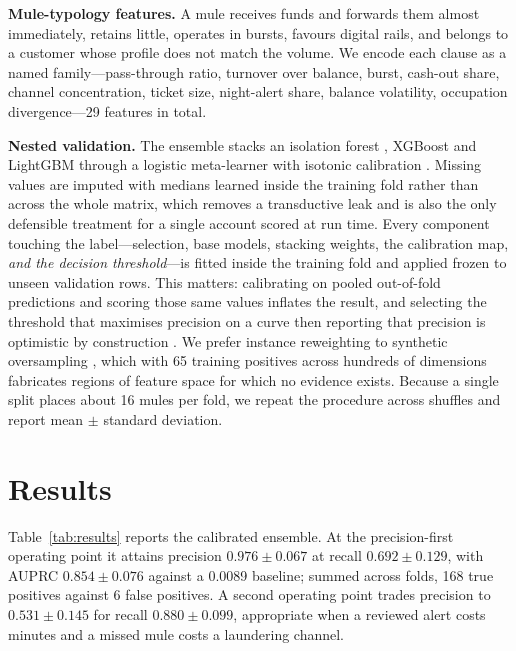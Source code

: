 \documentclass{article}
\begin{document}
\textbf{Mule-typology features.} A mule receives funds and forwards them almost
immediately, retains little, operates in bursts, favours digital rails, and
belongs to a customer whose profile does not match the volume. We encode each
clause as a named family---pass-through ratio, turnover over balance, burst,
cash-out share, channel concentration, ticket size, night-alert share, balance
volatility, occupation divergence---29 features in total.

\textbf{Nested validation.} The ensemble stacks an isolation forest
\cite{liu2008isolation}, XGBoost \cite{chen2016xgboost} and LightGBM
\cite{ke2017lightgbm} through a logistic meta-learner \cite{wolpert1992stacking}
with isotonic calibration \cite{zadrozny2002calibration}. Missing values are
imputed with medians learned inside the training fold rather than across the
whole matrix, which removes a transductive leak and is also the only defensible
treatment for a single account scored at run time. Every component
touching the label---selection, base models, stacking weights, the calibration
map, \emph{and the decision threshold}---is fitted inside the training fold and
applied frozen to unseen validation rows. This matters: calibrating on pooled
out-of-fold predictions and scoring those same values inflates the result, and
selecting the threshold that maximises precision on a curve then reporting that
precision is optimistic by construction \cite{cawley2010overfitting}. We prefer
instance reweighting to synthetic oversampling \cite{chawla2002smote}, which with
65 training positives across hundreds of dimensions fabricates regions of feature
space for which no evidence exists. Because a single split places about 16 mules
per fold, we repeat the procedure across shuffles and report mean $\pm$ standard
deviation.

\section{Results}
\label{sec:results}

Table~\ref{tab:results} reports the calibrated ensemble. At the precision-first
operating point it attains precision $0.976 \pm 0.067$ at recall
$0.692 \pm 0.129$, with AUPRC $0.854 \pm 0.076$ against a
0.0089 baseline; summed across folds,
168 true positives against 6 false positives. A
second operating point trades precision to $0.531 \pm 0.145$ for recall
$0.880 \pm 0.099$, appropriate when a reviewed alert costs minutes and a missed
mule costs a laundering channel.
\end{document}
